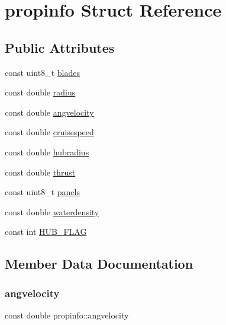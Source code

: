 \hypertarget{structpropinfo}{}\section{propinfo Struct Reference}
\label{structpropinfo}
\subsection*{Public Attributes}
\begin{DoxyCompactItemize}
\item 
const uint8\+\_\+t \hyperlink{structpropinfo_a4403efa08fb7b4ee49c84535bd9e57ca}{blades}
\item 
const double \hyperlink{structpropinfo_ab97e15f8f02761119a39aa355ffd107a}{radius}
\item 
const double \hyperlink{structpropinfo_a62c88621e9b2eac06d82f402c99ef797}{angvelocity}
\item 
const double \hyperlink{structpropinfo_a161703faa4fdff0818d6651ea290401b}{cruisespeed}
\item 
const double \hyperlink{structpropinfo_a08dae2c6a351de3838c96d4a081a1b63}{hubradius}
\item 
const double \hyperlink{structpropinfo_a67edf777e6ffd69c43cb6c0a116b7a96}{thrust}
\item 
const uint8\+\_\+t \hyperlink{structpropinfo_a4d46cdb32b6b0dbb875768ca23edaf98}{panels}
\item 
const double \hyperlink{structpropinfo_a33c2f6c5cec21fda9fe54b7b905ca616}{waterdensity}
\item 
const int \hyperlink{structpropinfo_ad8b723ca11979cb30a2fa0e0cbf5b47c}{H\+U\+B\+\_\+\+F\+L\+AG}
\end{DoxyCompactItemize}


\subsection{Member Data Documentation}
\mbox{\label{structpropinfo_a62c88621e9b2eac06d82f402c99ef797}} 
\subsubsection{\texorpdfstring{angvelocity}{angvelocity}}
{\footnotesize\ttfamily const double propinfo\+::angvelocity}

